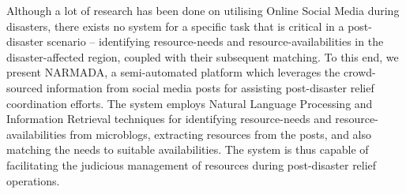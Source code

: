 Although a lot of research has been done on utilising Online Social Media during disasters, there exists no system for a specific task that is critical in a post-disaster scenario -- identifying resource-needs and resource-availabilities in the disaster-affected region, coupled with their subsequent matching. To this end, we present NARMADA, a semi-automated platform which leverages the crowd-sourced information from social media posts for assisting post-disaster relief coordination efforts. The system employs Natural Language Processing and Information Retrieval techniques for identifying resource-needs and resource-availabilities from microblogs, extracting resources from the posts, and also matching the needs to suitable availabilities. The system is thus capable of facilitating the judicious management of resources during post-disaster relief operations.
